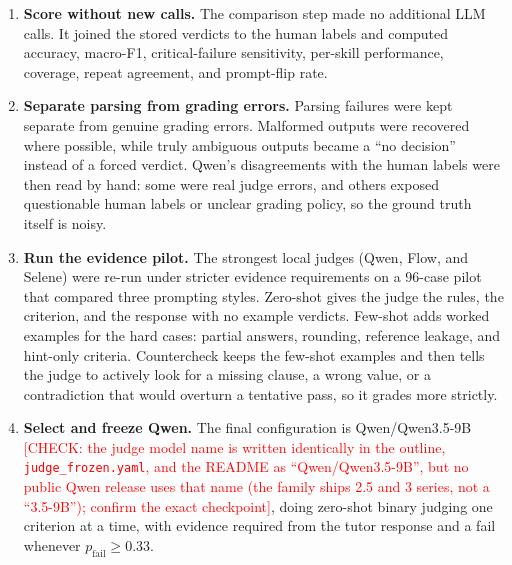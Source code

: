 \begin{enumerate}
  canonical runs to measure test-retest consistency, then three
  meaning-preserving prompt variants, namely added whitespace, renamed headers,
  and more polite instructions. 
  \item \textbf{Score without new calls.} The comparison step made no additional
  LLM calls. It joined the stored verdicts to the human labels and computed
  accuracy, macro-F1, critical-failure sensitivity, per-skill performance,
  coverage, repeat agreement, and prompt-flip rate.
  \item \textbf{Separate parsing from grading errors.} Parsing failures were kept
  separate from genuine grading errors. Malformed outputs were recovered where
  possible, while truly ambiguous outputs became a ``no decision'' instead of a
  forced verdict. Qwen's disagreements with the human labels were then read by
  hand: some were real judge errors, and others exposed questionable human labels
  or unclear grading policy, so the ground truth itself is noisy.
  \item \textbf{Run the evidence pilot.} The strongest local judges (Qwen, Flow,
  and Selene) were re-run under stricter evidence requirements on a 96-case pilot
  that compared three prompting styles. Zero-shot gives the judge the rules, the
  criterion, and the response with no example verdicts. Few-shot adds worked
  examples for the hard cases: partial answers, rounding, reference leakage, and
  hint-only criteria. Countercheck keeps the few-shot examples and then tells the
  judge to actively look for a missing clause, a wrong value, or a contradiction
  that would overturn a tentative pass, so it grades more strictly.
  \item \textbf{Select and freeze Qwen.} The final configuration is
  Qwen/Qwen3.5-9B
  \textcolor{red}{[CHECK: the judge model name is written identically in the
  outline, \texttt{judge\_frozen.yaml}, and the README as ``Qwen/Qwen3.5-9B'',
  but no public Qwen release uses that name (the family ships 2.5 and 3 series,
  not a ``3.5-9B''); confirm the exact checkpoint]}, doing zero-shot binary
  judging one criterion at a time, with evidence required from the tutor response
  and a fail whenever $p_{\mathrm{fail}} \geq 0.33$. 
\end{enumerate}


